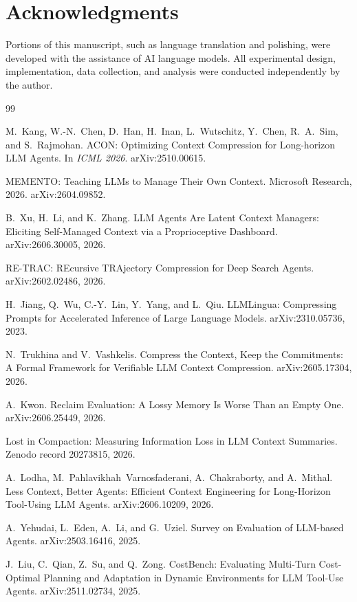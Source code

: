 \documentclass[11pt]{article}
\begin{document}
\section*{Acknowledgments}
Portions of this manuscript, such as language translation and polishing, were developed
with the assistance of AI language models. All experimental design, implementation, data
collection, and analysis were conducted independently by the author.


\begin{thebibliography}{99}

 M.~Kang, W.-N.~Chen, D.~Han, H.~Inan, L.~Wutschitz, Y.~Chen, R.~A.~Sim, and
  S.~Rajmohan. ACON: Optimizing Context Compression for Long-horizon LLM Agents. In
  \emph{ICML 2026}. arXiv:2510.00615.

 MEMENTO: Teaching LLMs to Manage Their Own Context. Microsoft Research, 2026.
  arXiv:2604.09852.

 B.~Xu, H.~Li, and K.~Zhang. LLM Agents Are Latent Context Managers: Eliciting
  Self-Managed Context via a Proprioceptive Dashboard. arXiv:2606.30005, 2026.

 RE-TRAC: REcursive TRAjectory Compression for Deep Search Agents.
  arXiv:2602.02486, 2026.

 H.~Jiang, Q.~Wu, C.-Y.~Lin, Y.~Yang, and L.~Qiu. LLMLingua: Compressing
  Prompts for Accelerated Inference of Large Language Models. arXiv:2310.05736, 2023.

 N.~Trukhina and V.~Vashkelis. Compress the Context, Keep the Commitments:
  A Formal Framework for Verifiable LLM Context Compression. arXiv:2605.17304, 2026.

 A.~Kwon. Reclaim Evaluation: A Lossy Memory Is Worse Than an Empty One.
  arXiv:2606.25449, 2026.

 Lost in Compaction: Measuring Information Loss in LLM Context
  Summaries. Zenodo record 20273815, 2026.

 A.~Lodha, M.~Pahlavikhah~Varnosfaderani, A.~Chakraborty, and A.~Mithal.
  Less Context, Better Agents: Efficient Context Engineering for Long-Horizon Tool-Using LLM
  Agents. arXiv:2606.10209, 2026.

 A.~Yehudai, L.~Eden, A.~Li, and G.~Uziel. Survey on Evaluation of LLM-based
  Agents. arXiv:2503.16416, 2025.

 J.~Liu, C.~Qian, Z.~Su, and Q.~Zong. CostBench: Evaluating Multi-Turn
  Cost-Optimal Planning and Adaptation in Dynamic Environments for LLM Tool-Use Agents.
  arXiv:2511.02734, 2025.


\end{thebibliography}
\end{document}
